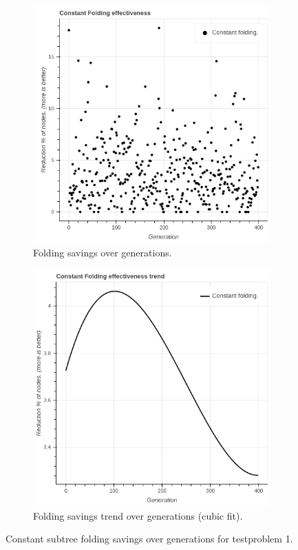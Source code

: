 \begin{figure}
    \centering
    \begin{subfigure}{0.6\textwidth}
    \centering
        \includegraphics[width=0.8\linewidth]{figures/ctfold.png}
        \caption{Folding savings over generations.}
    \end{subfigure}%
    \begin{subfigure}{0.6\textwidth}
    \centering
        \includegraphics[width=0.8\linewidth]{figures/ctfoldtrend.png}
        \caption{Folding savings trend over generations (cubic fit).}
    \end{subfigure}
    \caption{Constant subtree folding savings over generations for testproblem 1.}
    \label{fig:ctfoldproblem1}
    \end{figure}
